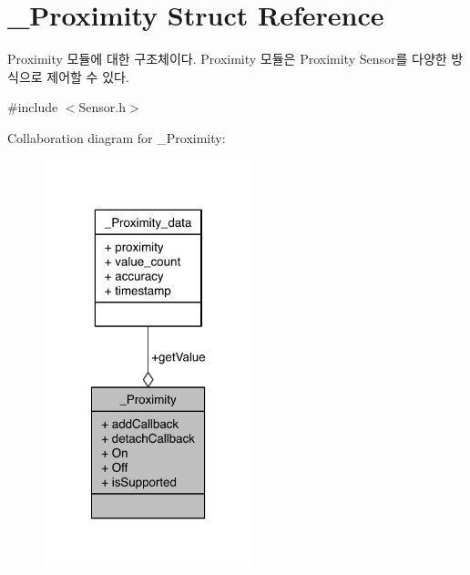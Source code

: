 \hypertarget{struct__Proximity}{\section{\-\_\-\-Proximity Struct Reference}
\label{struct__Proximity}
}


Proximity 모듈에 대한 구조체이다. Proximity 모듈은 Proximity Sensor를 다양한 방식으로 제어할 수 있다.  




{\ttfamily \#include $<$Sensor.\-h$>$}



Collaboration diagram for \-\_\-\-Proximity\-:\nopagebreak
\begin{figure}[H]
\begin{center}
\leavevmode
\includegraphics[width=173pt]{db/df8/struct__Proximity__coll__graph}
\end{center}
\end{figure}
